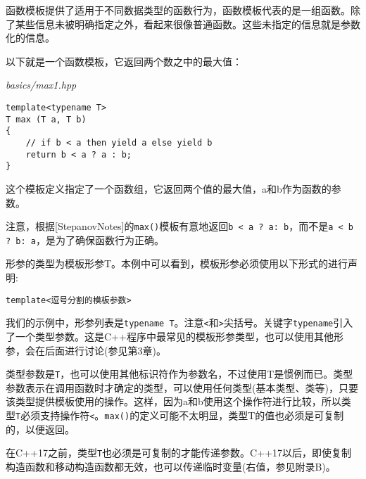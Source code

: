 

函数模板提供了适用于不同数据类型的函数行为，函数模板代表的是一组函数。除了某些信息未被明确指定之外，看起来很像普通函数。这些未指定的信息就是参数化的信息。


以下就是一个函数模板，它返回两个数之中的最大值：

\noindent
\textit{basics/max1.hpp}
\begin{lstlisting}[style=styleCXX]
template<typename T>
T max (T a, T b)
{
	// if b < a then yield a else yield b
	return b < a ? a : b;
}
\end{lstlisting}

这个模板定义指定了一个函数组，它返回两个值的最大值，a和b作为函数的参数。

\begin{tcolorbox}[colback=webgreen!5!white,colframe=webgreen!75!black]
\hspace*{0.75cm}注意，根据[StepanovNotes]的\texttt{max()}模板有意地返回\texttt{b < a ? a: b}，而不是\texttt{a < b ? b: a}，是为了确保函数行为正确。
\end{tcolorbox}

形参的类型为模板形参T。本例中可以看到，模板形参必须使用以下形式的进行声明:

\begin{lstlisting}[style=styleCXX]
template<逗号分割的模板参数>
\end{lstlisting}

我们的示例中，形参列表是\texttt{typename T}。注意\texttt{<}和\texttt{>}尖括号。关键字\texttt{typename}引入了一个类型参数。这是C++程序中最常见的模板形参类型，也可以使用其他形参，会在后面进行讨论(参见第3章)。

类型参数是\texttt{T}，也可以使用其他标识符作为参数名，不过使用T是惯例而已。类型参数表示在调用函数时才确定的类型，可以使用任何类型(基本类型、类等)，只要该类型提供模板使用的操作。这样，因为a和b使用这个操作符进行比较，所以类型\texttt{T}必须支持操作符\texttt{<}。\texttt{max()}的定义可能不太明显，类型T的值也必须是可复制的，以便返回。

\begin{tcolorbox}[colback=webgreen!5!white,colframe=webgreen!75!black]
\hspace*{0.75cm}在C++17之前，类型\texttt{T}也必须是可复制的才能传递参数。C++17以后，即使复制构造函数和移动构造函数都无效，也可以传递临时变量(右值，参见附录B)。
\end{tcolorbox}

